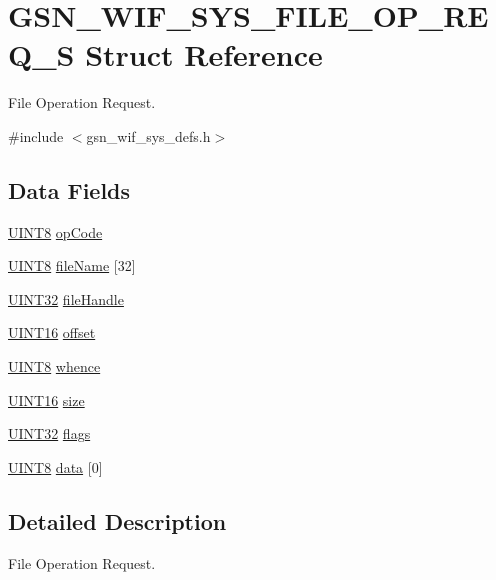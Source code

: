\hypertarget{a00350}{
\section{GSN\_\-WIF\_\-SYS\_\-FILE\_\-OP\_\-REQ\_\-S Struct Reference}
\label{a00350}
}


File Operation Request.  




{\ttfamily \#include $<$gsn\_\-wif\_\-sys\_\-defs.h$>$}

\subsection*{Data Fields}
\begin{DoxyCompactItemize}
\item 
\hyperlink{a00660_gab27e9918b538ce9d8ca692479b375b6a}{UINT8} \hyperlink{a00350_adcf88f6496d374c89792872ab087189d}{opCode}
\item 
\hyperlink{a00660_gab27e9918b538ce9d8ca692479b375b6a}{UINT8} \hyperlink{a00350_a44211bff423210b4e239a8616f8bbd33}{fileName} \mbox{[}32\mbox{]}
\item 
\hyperlink{a00660_gae1e6edbbc26d6fbc71a90190d0266018}{UINT32} \hyperlink{a00350_a31636a2d20d4a83f03ddba7c789cb00a}{fileHandle}
\item 
\hyperlink{a00660_ga09f1a1fb2293e33483cc8d44aefb1eb1}{UINT16} \hyperlink{a00350_af7c1ea69079dc905761ed0a19ec036ab}{offset}
\item 
\hyperlink{a00660_gab27e9918b538ce9d8ca692479b375b6a}{UINT8} \hyperlink{a00350_af59d0bebb48b89bbf9945d9c478c1949}{whence}
\item 
\hyperlink{a00660_ga09f1a1fb2293e33483cc8d44aefb1eb1}{UINT16} \hyperlink{a00350_a68890417cb73114517d0d8c594bd282e}{size}
\item 
\hyperlink{a00660_gae1e6edbbc26d6fbc71a90190d0266018}{UINT32} \hyperlink{a00350_a5a821be372043cabb6e452c3ce9bc068}{flags}
\item 
\hyperlink{a00660_gab27e9918b538ce9d8ca692479b375b6a}{UINT8} \hyperlink{a00350_a29500e452cff835f2b70d1dff36f918a}{data} \mbox{[}0\mbox{]}
\end{DoxyCompactItemize}


\subsection{Detailed Description}
File Operation Request. 

